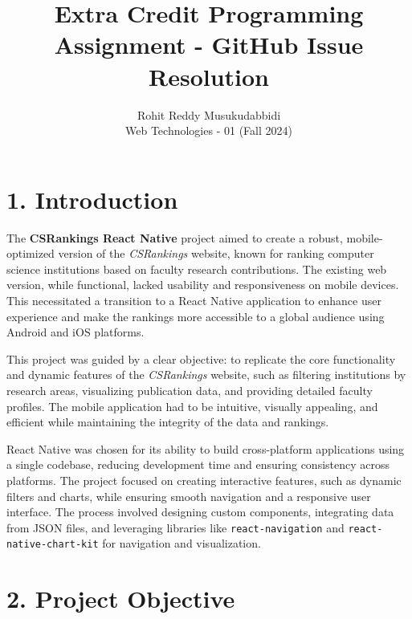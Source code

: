 \documentclass[12pt]{article}
\begin{document}
 
 
\title{Extra Credit Programming Assignment - GitHub Issue Resolution}%
\author{Rohit Reddy Musukudabbidi\\ %
Web Technologies - 01 (Fall 2024)} %
 
\maketitle
 
\section*{1. Introduction}

The \textbf{CSRankings React Native} project aimed to create a robust, mobile-optimized version of the \textit{CSRankings} website, known for ranking computer science institutions based on faculty research contributions. The existing web version, while functional, lacked usability and responsiveness on mobile devices. This necessitated a transition to a React Native application to enhance user experience and make the rankings more accessible to a global audience using Android and iOS platforms.

\bigskip
This project was guided by a clear objective: to replicate the core functionality and dynamic features of the \textit{CSRankings} website, such as filtering institutions by research areas, visualizing publication data, and providing detailed faculty profiles. The mobile application had to be intuitive, visually appealing, and efficient while maintaining the integrity of the data and rankings.

\bigskip
React Native was chosen for its ability to build cross-platform applications using a single codebase, reducing development time and ensuring consistency across platforms. The project focused on creating interactive features, such as dynamic filters and charts, while ensuring smooth navigation and a responsive user interface. The process involved designing custom components, integrating data from JSON files, and leveraging libraries like \texttt{react-navigation} and \texttt{react-native-chart-kit} for navigation and visualization.

\bigskip
\section*{2. Project Objective}
\end{document}
